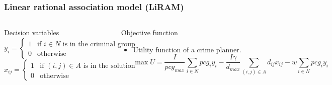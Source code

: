 \documentclass[aspectratio=169]{beamer}
\begin{document}
\begin{frame}
\frametitle{Linear rational association model (LiRAM)}
\begin{columns}
    \begin{block}{Decision variables}
    \footnotesize
      \vspace{1em}
      $y_{i} =
        \begin{cases}
          1 & \text{if $i \in N$ is in the criminal group}\\
          0 & \text{otherwise}
        \end{cases}$\\
      $x_{ij} =
        \begin{cases}
          1 & \text{if $(i,j) \in A$ is in the solution}\\
          0 & \text{otherwise}
        \end{cases}$
    \end{block}
  \begin{block}{Objective function}
    \begin{itemize}
    \footnotesize
      \item Utility function of a crime planner.
      \begin{equation*}
        \max U = \frac{I}{pcg_{max}} \sum_{i \in N} pcg_i y_i - \frac{I \gamma}{d_{max}} \sum_{(i,j) \in A} d_{ij} x_{ij} - w \sum_{i \in N} pcg_i y_i
      \end{equation*}
    \end{itemize}
  \end{block}
    \begin{figure}[ht]
      \centering
      \includegraphics[width=0.7\textwidth]{images/liram-2.pdf}
    \end{figure}
  \end{columns}
\end{frame}
\end{document}
